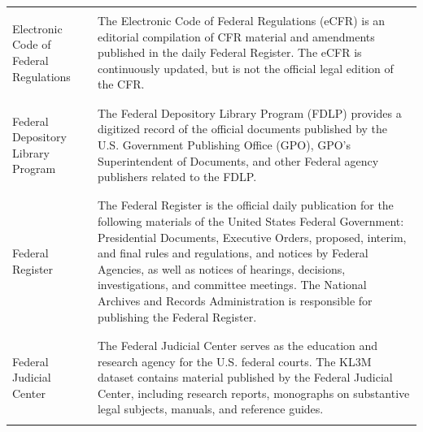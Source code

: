 \documentclass{article}
\begin{document}
\begin{appendices}
\begin{table}[h!]
\begin{longtable}{ p{3cm} p{9cm} }
\\   
 \\\hline
  \\
Electronic Code of Federal Regulations &
The Electronic Code of Federal Regulations (eCFR) is an editorial compilation of CFR material and amendments published in the daily Federal Register. The eCFR is continuously updated, but is not the official legal edition of the CFR.   
\\   
 \\\hline
  \\
Federal Depository 
Library Program &
The Federal Depository Library Program (FDLP) provides a digitized record of the official documents published by the U.S. Government Publishing Office (GPO), GPO’s Superintendent of Documents, and other Federal agency publishers related to the FDLP.    
\\   
 \\\hline
  \\
Federal Register &
The Federal Register is the official daily publication for the following materials of the United States Federal Government: Presidential Documents, Executive Orders, proposed, interim, and final rules and regulations, and notices by Federal Agencies, as well as notices of hearings, decisions, investigations, and committee meetings. The National Archives and Records Administration is responsible for publishing the Federal Register.    
\\   
 \\\hline
  \\
Federal Judicial Center &
The Federal Judicial Center serves as the education and research agency for the U.S. federal courts. The KL3M dataset contains material published by the Federal Judicial Center, including research reports, monographs on substantive legal subjects, manuals, and reference guides.
\\
 \\\hline  
    \end{longtable}

\end{table}
\pagebreak


\end{appendices}
\end{document}
